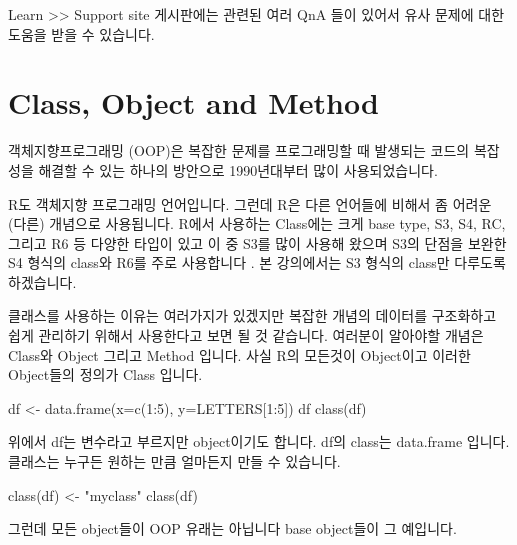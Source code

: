\documentclass[
]{book}
\newenvironment{Shaded}{\begin{snugshade}}{\end{snugshade}}
\newcommand{\AttributeTok}[1]{\textcolor[rgb]{0.77,0.63,0.00}{#1}}
\newcommand{\DecValTok}[1]{\textcolor[rgb]{0.00,0.00,0.81}{#1}}
\newcommand{\FunctionTok}[1]{\textcolor[rgb]{0.00,0.00,0.00}{#1}}
\newcommand{\NormalTok}[1]{#1}
\newcommand{\OtherTok}[1]{\textcolor[rgb]{0.56,0.35,0.01}{#1}}
\newcommand{\SpecialCharTok}[1]{\textcolor[rgb]{0.00,0.00,0.00}{#1}}
\newcommand{\StringTok}[1]{\textcolor[rgb]{0.31,0.60,0.02}{#1}}
\begin{document}
Learn \textgreater\textgreater{} Support site 게시판에는 관련된 여러 QnA 들이 있어서 유사 문제에 대한 도움을 받을 수 있습니다.

\hypertarget{class-object-and-method}{%
\section{Class, Object and Method}\label{class-object-and-method}}

객체지향프로그래밍 (OOP)은 복잡한 문제를 프로그래밍할 때 발생되는 코드의 복잡성을 해결할 수 있는 하나의 방안으로 1990년대부터 많이 사용되었습니다.

R도 객체지향 프로그래밍 언어입니다. 그런데 R은 다른 언어들에 비해서 좀 어려운 (다른) 개념으로 사용됩니다. R에서 사용하는 Class에는 크게 base type, S3, S4, RC, 그리고 R6 등 다양한 타입이 있고 이 중 S3를 많이 사용해 왔으며 S3의 단점을 보완한 S4 형식의 class와 R6를 주로 사용합니다 \citep{AdvancedR}. 본 강의에서는 S3 형식의 class만 다루도록 하겠습니다.

클래스를 사용하는 이유는 여러가지가 있겠지만 복잡한 개념의 데이터를 구조화하고 쉽게 관리하기 위해서 사용한다고 보면 될 것 같습니다. 여러분이 알아야할 개념은 Class와 Object 그리고 Method 입니다. 사실 R의 모든것이 Object이고 이러한 Object들의 정의가 Class 입니다.

\begin{Shaded}
\begin{Highlighting}[]
\NormalTok{df }\OtherTok{\textless{}{-}} \FunctionTok{data.frame}\NormalTok{(}\AttributeTok{x=}\FunctionTok{c}\NormalTok{(}\DecValTok{1}\SpecialCharTok{:}\DecValTok{5}\NormalTok{), }\AttributeTok{y=}\NormalTok{LETTERS[}\DecValTok{1}\SpecialCharTok{:}\DecValTok{5}\NormalTok{])}
\NormalTok{df}
\FunctionTok{class}\NormalTok{(df)}
\end{Highlighting}
\end{Shaded}

위에서 df는 변수라고 부르지만 object이기도 합니다. df의 class는 data.frame 입니다. 클래스는 누구든 원하는 만큼 얼마든지 만들 수 있습니다.

\begin{Shaded}
\begin{Highlighting}[]
\FunctionTok{class}\NormalTok{(df) }\OtherTok{\textless{}{-}} \StringTok{"myclass"}
\FunctionTok{class}\NormalTok{(df)}
\end{Highlighting}
\end{Shaded}

그런데 모든 object들이 OOP 유래는 아닙니다 base object들이 그 예입니다.
\end{document}
